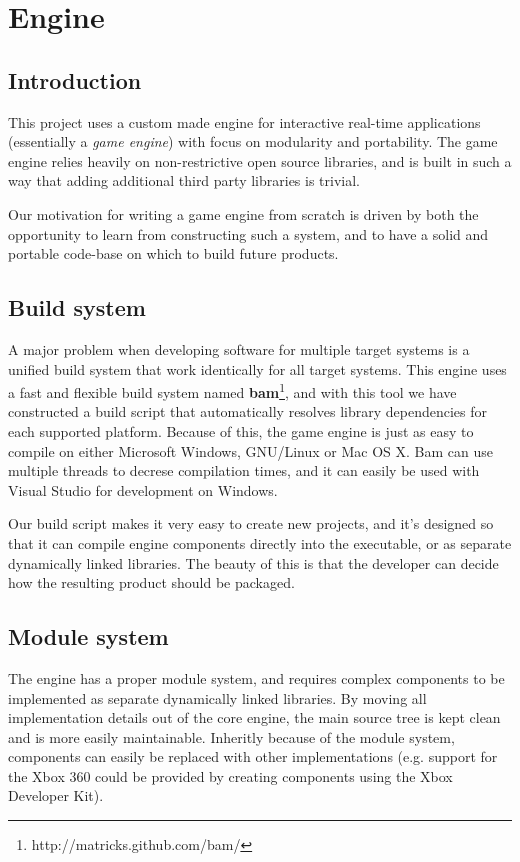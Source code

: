 
\chapter{Engine}
\section {Introduction}
This project uses a custom made engine for interactive real-time applications (essentially a \textit{game engine}) with focus on modularity and portability. The game engine relies heavily on non-restrictive open source libraries, and is built in such a way that adding additional third party libraries is trivial.

Our motivation for writing a game engine from scratch is driven by both the opportunity to learn from
constructing such a system, and to have a solid and portable code-base on which to build future products.

\section {Build system}
A major problem when developing software for multiple target systems is a unified build system that work
identically for all target systems. This engine uses a fast and flexible build system named \textbf{bam}\footnote{http://matricks.github.com/bam/}, and
with this tool we have constructed a build script that automatically resolves library dependencies for each supported platform. Because of this, the game engine is just as easy to compile on either Microsoft Windows, GNU/Linux or Mac OS X. Bam can use multiple threads to decrese compilation times, and it can easily be used with Visual Studio for development on Windows.

Our build script makes it very easy to create new projects, and it's designed so that it can compile engine components directly into the executable, or as separate dynamically linked libraries. The beauty of this is that the developer can decide how the resulting product should be packaged.

\newpage

\section{Module system}
The engine has a proper module system, and requires complex components to be implemented as separate dynamically linked libraries. By moving all implementation details out of the core engine, the main source tree is kept clean and is more easily maintainable. Inheritly because of the module system, components can easily be replaced with other implementations (e.g. support for the Xbox 360 could be provided
by creating components using the Xbox Developer Kit).

